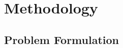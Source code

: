 \documentclass[11pt]{article}
\newcommand{\approach}{{GlimpRouter}\xspace}
\begin{document}
% 










\section{Methodology}
\label{sec:method}







\subsection{Problem Formulation}
\label{ssec:formulation}
\end{document}
